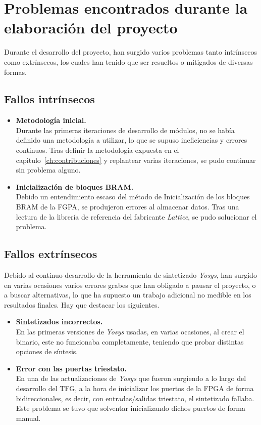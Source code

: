 \section{Problemas encontrados durante la elaboración del proyecto}
Durante el desarrollo del proyecto, han surgido varios problemas tanto intrínsecos como extrínsecos, los cuales han tenido que ser resueltos o mitigados de diversas formas. 

\subsection{Fallos intrínsecos}
\begin{itemize}
    \item \textbf{Metodología inicial.} \\
    Durante las primeras iteraciones de desarrollo de módulos, no se había definido una metodología a utilizar, lo que se supuso ineficiencias y errores continuos. Tras definir la metodología expuesta en el capitulo~\ref{ch:contribuciones} y replantear varias iteraciones, se pudo continuar sin problema alguno.
    
    \item \textbf{Inicialización de bloques BRAM.} \\
    Debido un entendimiento escaso del método de Inicialización de los bloques BRAM de la FGPA, se produjeron errores al almacenar datos. Tras una lectura de la librería de referencia\cite{lattice:ice-library} del fabricante \emph{Lattice}, se pudo solucionar el problema.
\end{itemize}

\subsection{Fallos extrínsecos}
Debido al continuo desarrollo de la herramienta de sintetizado \emph{Yosys}, han surgido en varias ocasiones varios errores grabes que han obligado a pausar el proyecto, o a buscar alternativas, lo que ha supuesto un trabajo adicional no medible en los resultados finales. Hay que destacar los siguientes.
\begin{itemize}
    \item \textbf{Sintetizados incorrectos.} \\
    En las primeras versiones de \emph{Yosys} usadas, en varias ocasiones, al crear el binario, este no funcionaba completamente, teniendo que probar distintas opciones de síntesis.

    \item \textbf{Error con las puertas triestato.} \\
    En una de las actualizaciones de \emph{Yosys} que fueron surgiendo a lo largo del desarrollo del TFG, a la hora de inicializar los puertos de la FPGA de forma bidireccionales, es decir, con entradas/salidas triestato, el sintetizado fallaba. Este problema se tuvo que solventar inicializando dichos puertos de forma manual.
\end{itemize}


